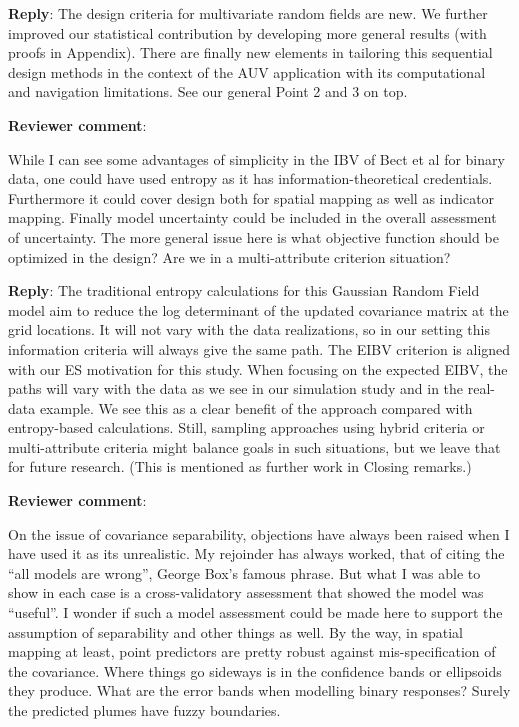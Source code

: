 \documentclass[a4paper]{article}
\def\revcom{\textbf{Reviewer comment}}
\def\reply{\textbf{Reply}}
\begin{document}
\begin{answers}
\reply: The design criteria for multivariate random fields are new. We further improved our statistical contribution by developing more general results (with proofs in Appendix). There are finally new elements in tailoring this sequential design methods in the context of the AUV application with its computational and navigation limitations. See our general Point 2 and 3 on top.

\item{\revcom  :}\label{r1c8}

While I can see some advantages of simplicity in the IBV of Bect et al for binary data, one could have used entropy as it has information-theoretical credentials. Furthermore it could cover design both for spatial mapping as well as indicator mapping. Finally model uncertainty could be included in the overall assessment of uncertainty. The more general issue here is what objective function should be optimized in the design? Are we in a multi-attribute criterion situation?

\reply: The traditional entropy calculations for this Gaussian Random Field model aim to reduce the log determinant of the updated covariance matrix at the grid locations. It will not vary with the data realizations, so in our setting this information criteria will always give the same path. The EIBV criterion is aligned with our ES motivation for this study. When focusing on the expected EIBV, the paths will vary with the data as we see in our simulation study and in the real-data example. We see this as a clear benefit of the approach compared with entropy-based calculations. Still, sampling approaches using hybrid criteria or multi-attribute criteria might balance goals in such situations, but we leave that for future research. (This is mentioned as further work in Closing remarks.) 

\item{\revcom  :}\label{r1c9}

On the issue of covariance separability, objections have always been raised when I have used it as its unrealistic. My rejoinder has always worked, that of citing the “all models are wrong”, George Box’s famous phrase. But what I was able to show in each case is a cross-validatory assessment that showed the model was “useful”. I wonder if such a model assessment could be made here to support the assumption of separability and other things as well. By the way, in spatial mapping at least, point predictors are pretty robust against mis-specification of the covariance. Where things go sideways is in the confidence bands or ellipsoids they produce. What are the error bands when modelling binary responses? Surely the predicted plumes have fuzzy boundaries. 


\end{answers}
\end{document}
